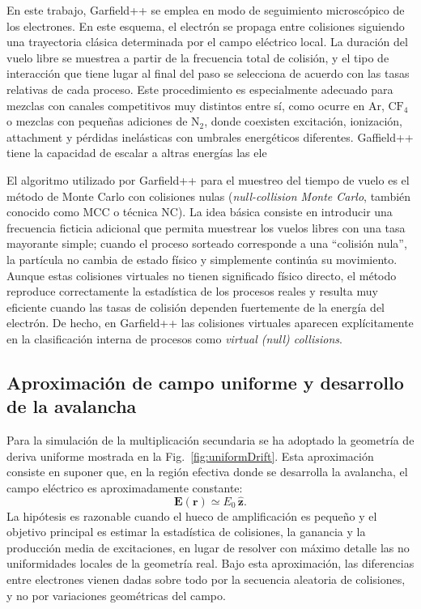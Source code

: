 \documentclass[12pt,a4paper]{article}
\newcommand{\N}{\mathrm{N}}
\newcommand{\Ar}{\mathrm{Ar}}
\newcommand{\CF}{\mathrm{CF}}
\begin{document}
En este trabajo, Garfield++ se emplea en modo de seguimiento microscópico de los electrones. En este esquema, el electrón se propaga entre colisiones siguiendo una trayectoria clásica determinada por el campo eléctrico local. La duración del vuelo libre se muestrea a partir de la frecuencia total de colisión, y el tipo de interacción que tiene lugar al final del paso se selecciona de acuerdo con las tasas relativas de cada proceso. Este procedimiento es especialmente adecuado para mezclas con canales competitivos muy distintos entre sí, como ocurre en \(\Ar\), \(\CF_4\) o mezclas con pequeñas adiciones de \(\N_2\), donde coexisten excitación, ionización, attachment y pérdidas inelásticas con umbrales energéticos diferentes. Gaffield++ tiene la capacidad de escalar a altras energías las ele

El algoritmo utilizado por {Garfield++} para el muestreo del tiempo de vuelo es el método de Monte Carlo con colisiones nulas (\textit{null-collision Monte Carlo}, también conocido como MCC o técnica NC). La idea básica consiste en introducir una frecuencia ficticia adicional que permita muestrear los vuelos libres con una tasa mayorante simple; cuando el proceso sorteado corresponde a una ``colisión nula'', la partícula no cambia de estado físico y simplemente continúa su movimiento. Aunque estas colisiones virtuales no tienen significado físico directo, el método reproduce correctamente la estadística de los procesos reales y resulta muy eficiente cuando las tasas de colisión dependen fuertemente de la energía del electrón. De hecho, en {Garfield++} las colisiones virtuales aparecen explícitamente en la clasificación interna de procesos como \textit{virtual (null) collisions}.

\subsection{Aproximación de campo uniforme y desarrollo de la avalancha}

Para la simulación de la multiplicación secundaria se ha adoptado la geometría de deriva uniforme mostrada en la Fig.~\ref{fig:uniformDrift}. Esta aproximación consiste en suponer que, en la región efectiva donde se desarrolla la avalancha, el campo eléctrico es aproximadamente constante:
\begin{equation}
    \mathbf{E}(\mathbf{r}) \simeq E_0\, \hat{\mathbf{z}}.
\end{equation}
La hipótesis es razonable cuando el hueco de amplificación es pequeño y el objetivo principal es estimar la estadística de colisiones, la ganancia y la producción media de excitaciones, en lugar de resolver con máximo detalle las no uniformidades locales de la geometría real. Bajo esta aproximación, las diferencias entre electrones vienen dadas sobre todo por la secuencia aleatoria de colisiones, y no por variaciones geométricas del campo.
\end{document}
